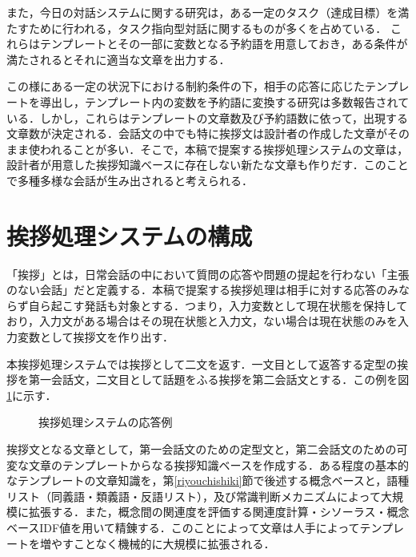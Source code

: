 また，今日の対話システムに関する研究は，ある一定のタスク（達成目標）を満たすために行われる，タスク指向型対話\cite{douzaka2001}\cite{Kanda2004}\cite{Sugimoto2002}に関するものが多くを占めている． これらはテンプレートとその一部に変数となる予約語を用意しておき，ある条件が満たされるとそれに適当な文章を出力する．

この様にある一定の状況下における制約条件の下，相手の応答に応じたテンプレートを導出し，テンプレート内の変数を予約語に変換する研究\cite{douzaka2001}\cite{Kanda2004}\cite{Sugimoto2002}は多数報告されている．しかし，これらはテンプレートの文章数及び予約語数に依って，出現する文章数が決定される．会話文の中でも特に挨拶文は設計者の作成した文章がそのまま使われることが多い．そこで，本稿で提案する挨拶処理システムの文章は，設計者が用意した挨拶知識ベースに存在しない新たな文章も作りだす．このことで多種多様な会話が生み出されると考えられる．

\section{挨拶処理システムの構成}
「挨拶」とは，日常会話の中において質問の応答や問題の提起を行わない「主張のない会話」だと定義する．本稿で提案する挨拶処理は相手に対する応答のみならず自ら起こす発話も対象とする．つまり，入力変数として現在状態を保持しており，入力文がある場合はその現在状態と入力文，ない場合は現在状態のみを入力変数として挨拶文を作り出す．

本挨拶処理システムでは挨拶として二文を返す．一文目として返答する定型の挨拶を第一会話文，二文目として話題をふる挨拶を第二会話文とする．この例を図\ref{fig:systemoutou}に示す．

\begin{figure}[htbp]
	\begin{center}
	  	\epsfxsize=10cm
		\caption{挨拶処理システムの応答例}
		\label{fig:systemoutou}
	\end{center}
\end{figure}
挨拶文となる文章として，第一会話文のための定型文と，第二会話文のための可変な文章のテンプレートからなる挨拶知識ベースを作成する．ある程度の基本的なテンプレートの文章知識を，第\ref{riyouchishiki}節で後述する概念ベースと，語種リスト（同義語・類義語・反語リスト），及び常識判断メカニズムによって大規模に拡張する．また，概念間の関連度を評価する関連度計算\cite{idutsu2002}\cite{watabe2001}・シソーラス\cite{NttThesaurus1997}・概念ベースIDF値\cite{okumura2005}を用いて精錬する．このことによって文章は人手によってテンプレートを増やすことなく機械的に大規模に拡張される．

